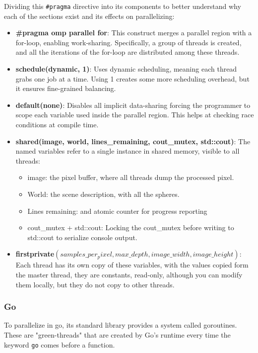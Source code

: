 Dividing this \texttt{\#pragma} directive into its components to better understand why each of the sections exist and its effects on parallelizing:
\begin{itemize}
    \item \textbf{\#pragma omp parallel for}: This construct merges a parallel region with a for-loop, enabling work-sharing. Specifically, a group of threads is created, and all the iterations of the for-loop  are distributed among these threads.
    
    \item \textbf{schedule(dynamic, 1)}: Uses dynamic scheduling, meaning each thread grabs one job at a time. Using 1 creates some more scheduling overhead, but it ensures fine-grained balancing.
    
    \item \textbf{default(none)}: Disables all implicit data-sharing forcing the programmer to scope each variable used inside the parallel region. This helps at checking race conditions at compile time.
    
    \item \textbf{shared(image, world, lines\_remaining, cout\_mutex, std::cout)}: The named variables refer to a single instance in shared memory, visible to all threads:
    \begin{itemize}
        \item image: the pixel buffer, where all threads dump the processed pixel.
        \item World: the scene description, with all the spheres.
        \item Lines remaining: and atomic counter for progress reporting
        \item cout\_mutex + std::cout: Locking the cout\_mutex before writing to std::cout to serialize console output.
    \end{itemize}
    
    \item \textbf{firstprivate$(
    samples\_ per_pixel,
    max\_ depth,
    image\_ width,
    image\_ height)$}:
    Each thread has its own copy of these variables, with the values copied form the master thread, they are constants, read-only, although you can modify them locally, but they do not copy to other threads.
\end{itemize}

\subsubsection{Go}
To parallelize in go, its standard library provides a system called \glspl{goroutine}. These are "\glspl{green-thread}" that are created by Go's runtime every time the keyword \texttt{go} comes before a function.

